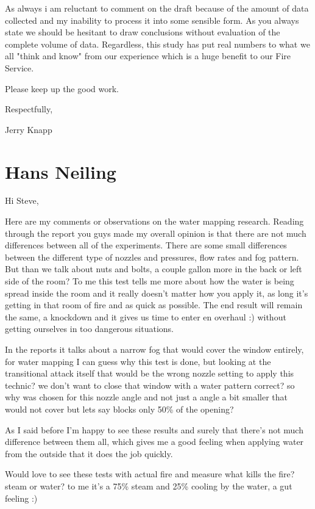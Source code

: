 \documentclass[12pt,oneside]{book}
\begin{document}
\begin{appendix}
As always i am reluctant to comment on the draft because of the amount of data collected and my inability to process it into some sensible form.  As you always state we should be hesitant to draw conclusions without evaluation of the complete volume of data.  Regardless, this study has put real numbers to what we all "think and know" from our experience which is a huge benefit to our Fire Service.
 
Please keep up the good work.
 
Respectfully,
 
Jerry Knapp

\section{Hans Neiling}

Hi Steve,
 
Here are my comments or observations on the water mapping research. Reading through the report you guys made my overall opinion is that there are not much differences between all of the experiments. There are some small differences between the different type of nozzles and pressures, flow rates and fog pattern. But than we talk about nuts and bolts, a couple gallon more in the back or left side of the room? To me this test tells me more about how the water is being spread inside the room and it really doesn't matter how you apply it, as long it's getting in that room of fire and as quick as possible. The end result will remain the same, a knockdown and it gives us time to enter en overhaul :) without getting ourselves in too dangerous situations.
 
In the reports it talks about a narrow fog that would cover the window entirely, for water mapping I can guess why this test is done, but looking at the transitional attack itself that would be the wrong nozzle setting to apply this technic? we don't want to close that window with a water pattern correct? so why was chosen for this nozzle angle and not just a angle a bit smaller that would not cover but lets say blocks only 50\% of the opening?
 
As I said before I'm happy to see these results and surely that there's not much difference between them all, which gives me a good feeling when applying water from the outside that it does the job quickly.

Would love to see these tests with actual fire and measure what kills the fire? steam or water? to me it's a 75\% steam and 25\% cooling by the water, a gut feeling :)
 

\end{appendix}
\end{document}
